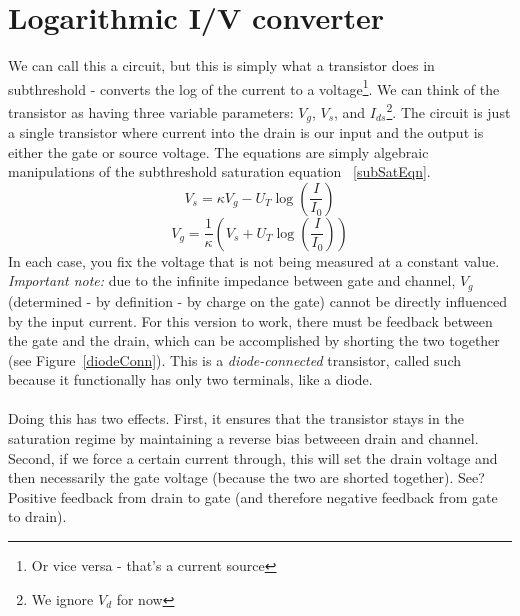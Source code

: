 \section{Logarithmic I/V converter}
We can call this a circuit, but this is simply what a transistor does in subthreshold - converts the log of the current to a voltage\footnote{Or vice versa - that's a current source}. We can think of the transistor as having three variable parameters: $V_g$, $V_s$, and $I_{ds}$\footnote{We ignore $V_d$ for now}. The circuit is just a single transistor where current into the drain is our input and the output is either the gate or source voltage. The equations are simply algebraic manipulations of the subthreshold saturation equation ~\eqref{subSatEqn}.
\begin{equation}
V_s = \kappa V_g - U_T \log \left(\frac{I}{I_0}\right)
\end{equation}
\begin{equation}
V_g = \frac{1}{\kappa}\left( V_s + U_T \log \left(\frac{I}{I_0}\right) \right)
\end{equation}
In each case, you fix the voltage that is not being measured at a constant value. \emph{Important note:} due to the infinite impedance between gate and channel, $V_g$ (determined  - by definition - by charge on the gate) cannot be directly influenced by the input current. For this version to work, there must be feedback between the gate and the drain, which can be accomplished by shorting the two together (see Figure~\ref{diodeConn}). This is a \emph{diode-connected} transistor, called such because it functionally has only two terminals, like a diode.\\ \\
Doing this has two effects. First, it ensures that the transistor stays in the saturation regime by maintaining a reverse bias betweeen drain and channel. Second, if we force a certain current through, this will set the drain voltage and then necessarily the gate voltage (because the two are shorted together). See? Positive feedback from drain to gate (and therefore negative feedback from gate to drain).



